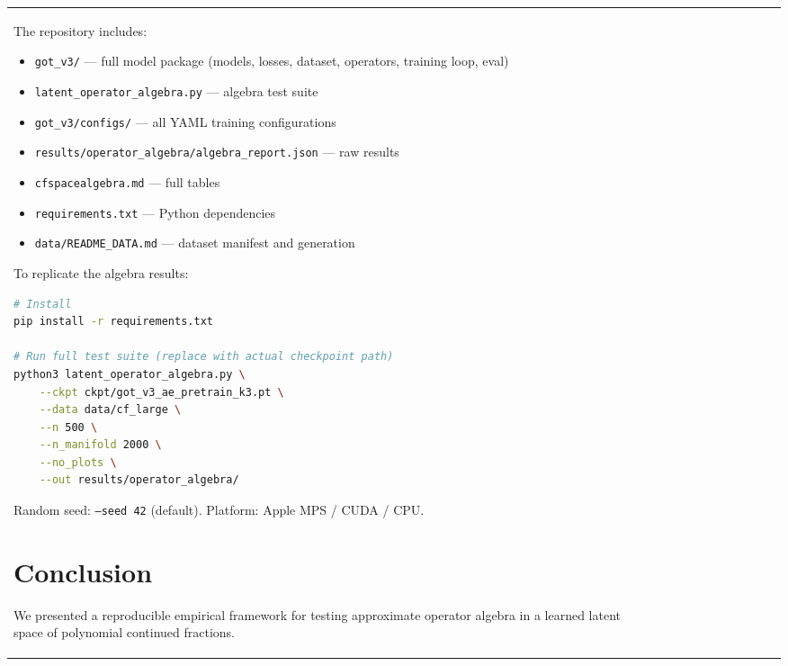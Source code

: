 \documentclass[11pt,a4paper]{article}
\begin{document}
\begin{table}[h]
\begin{tabular}{l|cccccccccc}
The repository \cite{cfspace2026github} includes:
\begin{itemize}[noitemsep]
  \item \texttt{got\_v3/} --- full model package (models, losses, dataset,
        operators, training loop, eval)
  \item \texttt{latent\_operator\_algebra.py} --- algebra test suite
  \item \texttt{got\_v3/configs/} --- all YAML training configurations
  \item \texttt{results/operator\_algebra/algebra\_report.json} --- raw results
  \item \texttt{cfspacealgebra.md} --- full tables
  \item \texttt{requirements.txt} --- Python dependencies
  \item \texttt{data/README\_DATA.md} --- dataset manifest and generation
\end{itemize}

To replicate the algebra results:
\begin{lstlisting}[language=bash, caption={Reproducing the algebra test suite.}]
# Install
pip install -r requirements.txt

# Run full test suite (replace with actual checkpoint path)
python3 latent_operator_algebra.py \
    --ckpt ckpt/got_v3_ae_pretrain_k3.pt \
    --data data/cf_large \
    --n 500 \
    --n_manifold 2000 \
    --no_plots \
    --out results/operator_algebra/
\end{lstlisting}

Random seed: \texttt{--seed 42} (default).  Platform: Apple MPS / CUDA / CPU.

\section{Conclusion}
\label{sec:conclusion}

We presented a reproducible empirical framework for testing approximate
operator algebra in a learned latent space of polynomial continued fractions.


\end{tabular}
\end{table}
\end{document}
